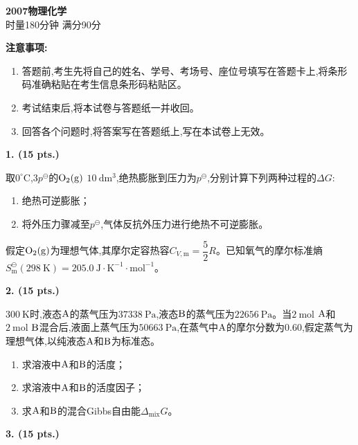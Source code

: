 \begin{center}
    {\LARGE \textbf{2007物理化学}} \\[2ex]
    {\large 时量180分钟 \quad 满分90分}
\end{center}

\vspace{0.5cm}
\noindent\textbf{注意事项:}
\begin{enumerate}[label=\arabic*., parsep=0pt, itemsep=0pt]
    \item 答题前,考生先将自己的姓名、学号、考场号、座位号填写在答题卡上,将条形码准确粘贴在考生信息条形码粘贴区。
    \item 考试结束后,将本试卷与答题纸一并收回。
    \item 回答各个问题时,将答案写在答题纸上,写在本试卷上无效。
\end{enumerate}

\vspace{0.5cm}
\noindent\textbf{1. (15 pts.)}

取$0^\circ\mathrm{C}$,$3p^\ominus$的$\ce{O_{2}(g)}$ $10\ \mathrm{dm^3}$,绝热膨胀到压力为$p^\ominus$,分别计算下列两种过程的$\Delta G$:
\begin{enumerate}[label=(\arabic*), itemsep=1ex]
    \item 绝热可逆膨胀；
    \item 将外压力骤减至$p^\ominus$,气体反抗外压力进行绝热不可逆膨胀。
\end{enumerate}
假定$\ce{O_{2}(g)}$为理想气体,其摩尔定容热容$C_{V,\mathrm{m}}=\dfrac{5}{2}R$。已知氧气的摩尔标准熵$S_\mathrm{m}^\ominus(298\ \mathrm{K})=205.0\ \mathrm{J\cdot K^{-1}\cdot mol^{-1}}$。

\vspace{0.5cm}
\noindent\textbf{2. (15 pts.)}

$300\ \mathrm{K}$时,液态$\ce{A}$的蒸气压为$37338\ \mathrm{Pa}$,液态$\ce{B}$的蒸气压为$22656\ \mathrm{Pa}$。当$2\ \mathrm{mol}$ $\ce{A}$和$2\ \mathrm{mol}$ $\ce{B}$混合后,液面上蒸气压为$50663\ \mathrm{Pa}$,在蒸气中$\ce{A}$的摩尔分数为$0.60$,假定蒸气为理想气体,以纯液态$\ce{A}$和$\ce{B}$为标准态。
\begin{enumerate}[label=(\arabic*), itemsep=1ex]
    \item 求溶液中$\ce{A}$和$\ce{B}$的活度；
    \item 求溶液中$\ce{A}$和$\ce{B}$的活度因子；
    \item 求$\ce{A}$和$\ce{B}$的混合Gibbs自由能$\Delta_\mathrm{mix}G$。
\end{enumerate}

\vspace{0.5cm}
\noindent\textbf{3. (15 pts.)}


